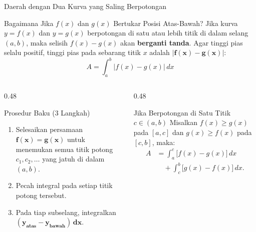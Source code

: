 \documentclass[aspectratio=43,10pt]{beamer}
\begin{document}
\begin{frame}{Daerah dengan Dua Kurva yang Saling Berpotongan}
    \begin{block}{Bagaimana Jika $f(x)$ dan $g(x)$ Bertukar Posisi Atas-Bawah?}
        \scriptsize\abovedisplayskip=3pt\belowdisplayskip=3pt
        Jika kurva $y = f(x)$ dan $y = g(x)$ berpotongan di satu atau lebih titik di dalam selang $(a, b)$, maka selisih $f(x) - g(x)$ akan \textbf{berganti tanda}. Agar tinggi pias selalu positif, tinggi pias pada sebarang titik $x$ adalah $\mathbf{|f(x) - g(x)|}$:
        $$\boxed{\;A = \int_{a}^{b} \big|f(x) - g(x)\big|\,dx\;}$$
    \end{block}

    \begin{columns}[T]
        \begin{column}{0.48\textwidth}
            \begin{exampleblock}{Prosedur Baku (3 Langkah)}
                \scriptsize
                \begin{enumerate}\itemsep=2pt
                    \item Selesaikan persamaan $\mathbf{f(x) = g(x)}$ untuk menemukan semua titik potong $c_1, c_2, \dots$ yang jatuh di dalam $(a, b)$.
                    \item Pecah integral pada setiap titik potong tersebut.
                    \item Pada tiap subselang, integralkan $\mathbf{(y_{\text{atas}} - y_{\text{bawah}})\,dx}$.
                \end{enumerate}
            \end{exampleblock}
        \end{column}

        \begin{column}{0.48\textwidth}
            \begin{alertblock}{Jika Berpotongan di Satu Titik $c \in (a,b)$}
                \scriptsize\abovedisplayskip=2pt\belowdisplayskip=2pt
                Misalkan $f(x) \ge g(x)$ pada $[a, c]$ dan $g(x) \ge f(x)$ pada $[c, b]$, maka:
                \begin{align*}
                    A &= \int_{a}^{c} \big[f(x) - g(x)\big]\,dx\\
                    &\quad + \int_{c}^{b} \big[g(x) - f(x)\big]\,dx.
                \end{align*}
            \end{alertblock}
        \end{column}
    \end{columns}
\end{frame}
\end{document}
